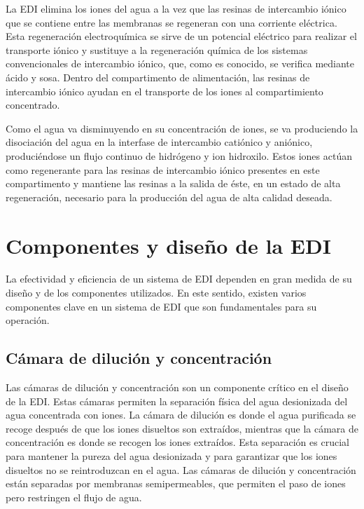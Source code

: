 La EDI elimina los iones del agua a la vez que las resinas de intercambio iónico que se contiene entre las membranas se
regeneran con una corriente eléctrica. Esta regeneración electroquímica se sirve de un potencial eléctrico para realizar el
transporte iónico y sustituye a la regeneración química de los sistemas convencionales de intercambio iónico, que, como es conocido,
se verifica mediante ácido y sosa. Dentro del compartimento de alimentación, las resinas de intercambio iónico ayudan en el transporte de los iones al compartimiento concentrado.

Como el agua va disminuyendo en su concentración de iones, se va produciendo la disociación del agua en la interfase de intercambio
catiónico y aniónico, produciéndose un flujo continuo de hidrógeno y ion hidroxilo. Estos iones actúan como regenerante para las resinas
de intercambio iónico presentes en este compartimento y mantiene las resinas a la salida de éste, en un estado de alta regeneración,
necesario para la producción del agua de alta calidad deseada.



\section{Componentes y diseño de la EDI}
La efectividad y eficiencia de un sistema de EDI dependen en gran medida de su diseño y de los componentes utilizados.
En este sentido, existen varios componentes clave en un sistema de EDI que son fundamentales para su operación. \\

\subsection{Cámara de dilución y concentración}
Las cámaras de dilución y concentración son un componente crítico en el diseño de la EDI. Estas cámaras permiten la separación
física del agua desionizada del agua concentrada con iones. La cámara de dilución es donde el agua purificada se recoge después
de que los iones disueltos son extraídos, mientras que la cámara de concentración es donde se recogen los iones extraídos.
Esta separación es crucial para mantener la pureza del agua desionizada y para garantizar que los iones disueltos no se
reintroduzcan en el agua. Las cámaras de dilución y concentración están separadas por membranas semipermeables, que permiten
el paso de iones pero restringen el flujo de agua. \\

